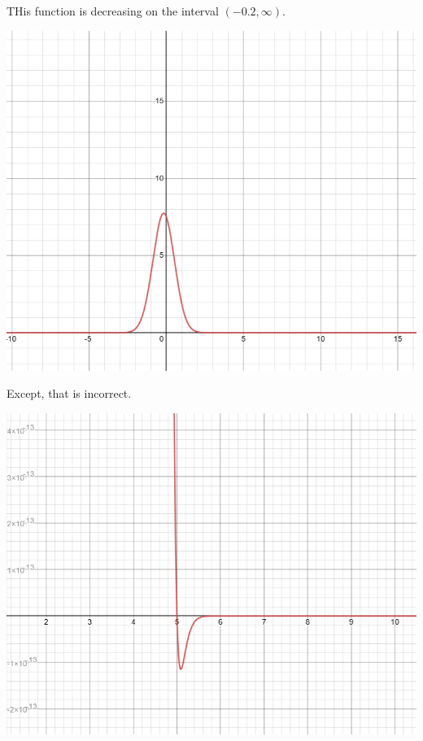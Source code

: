 \documentclass{ximera}
\begin{document}
\begin{example}


THis function is decreasing on the interval $(-0.2, \infty)$.

\begin{image}
\includegraphics{pics/graph_3A.png}
\end{image}




Except, that is incorrect.

\begin{image}
\includegraphics{pics/graph_3B.png}
\end{image}



\end{example}
\end{document}
